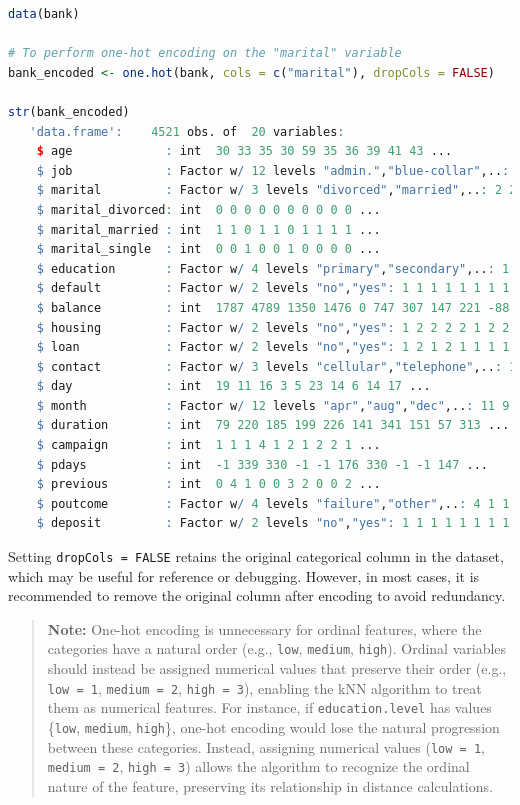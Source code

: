 \documentclass[
]{book}
\newcommand{\passthrough}[1]{#1}
\theoremstyle{definition}
\theoremstyle{definition}
\theoremstyle{definition}
\theoremstyle{definition}
\theoremstyle{remark}
\begin{document}
\begin{lstlisting}[language=R]
data(bank)

# To perform one-hot encoding on the "marital" variable
bank_encoded <- one.hot(bank, cols = c("marital"), dropCols = FALSE)

str(bank_encoded)
   'data.frame':    4521 obs. of  20 variables:
    $ age             : int  30 33 35 30 59 35 36 39 41 43 ...
    $ job             : Factor w/ 12 levels "admin.","blue-collar",..: 11 8 5 5 2 5 7 10 3 8 ...
    $ marital         : Factor w/ 3 levels "divorced","married",..: 2 2 3 2 2 3 2 2 2 2 ...
    $ marital_divorced: int  0 0 0 0 0 0 0 0 0 0 ...
    $ marital_married : int  1 1 0 1 1 0 1 1 1 1 ...
    $ marital_single  : int  0 0 1 0 0 1 0 0 0 0 ...
    $ education       : Factor w/ 4 levels "primary","secondary",..: 1 2 3 3 2 3 3 2 3 1 ...
    $ default         : Factor w/ 2 levels "no","yes": 1 1 1 1 1 1 1 1 1 1 ...
    $ balance         : int  1787 4789 1350 1476 0 747 307 147 221 -88 ...
    $ housing         : Factor w/ 2 levels "no","yes": 1 2 2 2 2 1 2 2 2 2 ...
    $ loan            : Factor w/ 2 levels "no","yes": 1 2 1 2 1 1 1 1 1 2 ...
    $ contact         : Factor w/ 3 levels "cellular","telephone",..: 1 1 1 3 3 1 1 1 3 1 ...
    $ day             : int  19 11 16 3 5 23 14 6 14 17 ...
    $ month           : Factor w/ 12 levels "apr","aug","dec",..: 11 9 1 7 9 4 9 9 9 1 ...
    $ duration        : int  79 220 185 199 226 141 341 151 57 313 ...
    $ campaign        : int  1 1 1 4 1 2 1 2 2 1 ...
    $ pdays           : int  -1 339 330 -1 -1 176 330 -1 -1 147 ...
    $ previous        : int  0 4 1 0 0 3 2 0 0 2 ...
    $ poutcome        : Factor w/ 4 levels "failure","other",..: 4 1 1 4 4 1 2 4 4 1 ...
    $ deposit         : Factor w/ 2 levels "no","yes": 1 1 1 1 1 1 1 1 1 1 ...
\end{lstlisting}

Setting \passthrough{\lstinline!dropCols = FALSE!} retains the original categorical column in the dataset, which may be useful for reference or debugging. However, in most cases, it is recommended to remove the original column after encoding to avoid redundancy.

\begin{quote}
\textbf{Note:} One-hot encoding is unnecessary for ordinal features, where the categories have a natural order (e.g., \passthrough{\lstinline!low!}, \passthrough{\lstinline!medium!}, \passthrough{\lstinline!high!}). Ordinal variables should instead be assigned numerical values that preserve their order (e.g., \passthrough{\lstinline!low = 1!}, \passthrough{\lstinline!medium = 2!}, \passthrough{\lstinline!high = 3!}), enabling the kNN algorithm to treat them as numerical features. For instance, if \passthrough{\lstinline!education.level!} has values \{\passthrough{\lstinline!low!}, \passthrough{\lstinline!medium!}, \passthrough{\lstinline!high!}\}, one-hot encoding would lose the natural progression between these categories. Instead, assigning numerical values (\passthrough{\lstinline!low = 1!}, \passthrough{\lstinline!medium = 2!}, \passthrough{\lstinline!high = 3!}) allows the algorithm to recognize the ordinal nature of the feature, preserving its relationship in distance calculations.
\end{quote}
\end{document}
